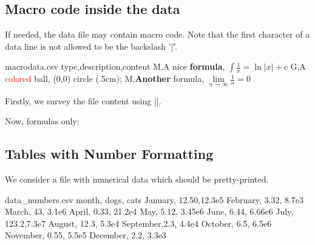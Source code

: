 \documentclass[a4paper,11pt]{ltxdoc}
\begin{document}
\clearpage
\subsection{Macro code inside the data}\label{macrocodexample}%

If needed, the data file may contain macro code. Note that the first character
of a data line is not allowed to be the backslash '|\|'.

\begin{tcbverbatimwrite}{macrodata.csv}
type,description,content
M,A nice \textbf{formula},         $\displaystyle \int\frac{1}{x} = \ln|x|+c$
G,A \textcolor{red}{colored} ball, {\tikz \shadedraw [shading=ball] (0,0) circle (.5cm);}
M,\textbf{Another} formula,        $\displaystyle \lim\limits_{n\to\infty} \frac{1}{n}=0$
\end{tcbverbatimwrite}


Firstly, we survey the file content using
|\csvautobooktabular|.

\begin{dispExample}
\end{dispExample}


\begin{dispExample}


\bigskip
Now, formulas only:
\end{dispExample}

\clearpage
\subsection{Tables with Number Formatting}\label{numberformatting}%

We consider a file with numerical data which should be pretty-printed.

\begin{tcbverbatimwrite}{data_numbers.csv}
month,    dogs, cats
January,  12.50,12.3e5
February, 3.32, 8.7e3
March,    43,   3.1e6
April,    0.33, 21.2e4
May,      5.12, 3.45e6
June,     6.44, 6.66e6
July,     123.2,7.3e7
August,   12.3, 5.3e4
September,2.3,  4.4e4
October,  6.5,  6.5e6
November, 0.55, 5.5e5
December, 2.2,  3.3e3
\end{tcbverbatimwrite}
\end{document}
